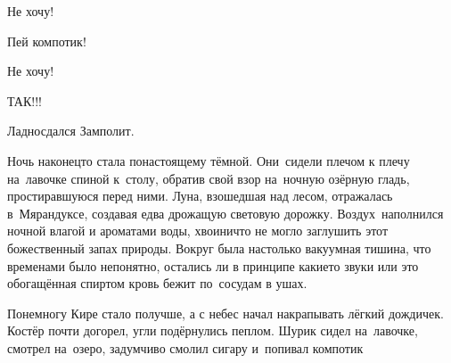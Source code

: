 \diagdash Не хочу!

\diagdash Пей компотик!

\diagdash Не хочу!

\diagdash ТАК!!!

\diagdash Ладно\myldots{}\mdash сдался Замполит.


Ночь наконец\sdash то стала по\sdash настоящему тёмной. Они~сидели плечом к плечу на~лавочке спиной к~столу, обратив свой взор на~ночную озёрную гладь, простиравшуюся перед ними. Луна, взошедшая над лесом, отражалась в~Мярандуксе, создавая едва дрожащую световую дорожку. Воздух~наполнился ночной влагой и ароматами воды, хвои\mdash ничто не могло заглушить этот божественный запах природы. Вокруг была настолько вакуумная тишина, что временами было непонятно, остались ли в принципе какие\sdash то звуки или это обогащённая спиртом кровь бежит по~сосудам в ушах.



Понемногу Кире стало получше, а с небес начал накрапывать лёгкий дождичек. Костёр почти догорел, угли подёрнулись пеплом. Шурик сидел на~лавочке, смотрел на~озеро, задумчиво смолил сигару и~попивал компотик\myldots{}



\begin{center}
\end{center}
